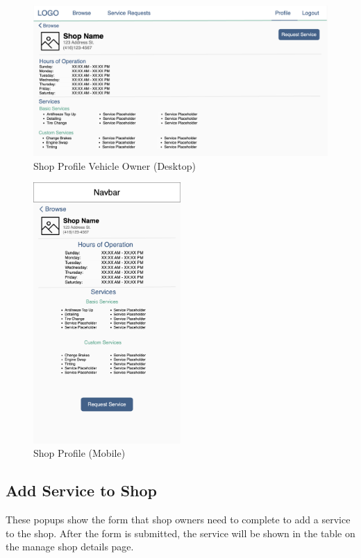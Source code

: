 \documentclass[12pt, titlepage]{article}
\begin{document}
\begin{figure}[H]
	\centering
	\includegraphics[width=\textwidth]{mockups/Shop Profile (Vehicle Owner) (Desktop).png}
	\caption{Shop Profile \textemdash{} Vehicle Owner (Desktop)}
\end{figure}

\begin{figure}[H]
	\centering
	\includegraphics[width=0.5\textwidth]{mockups/Shop Profile (Mobile).png}
	\caption{Shop Profile (Mobile)}
\end{figure}

\subsection{Add Service to Shop}
These popups show the form that shop owners need to complete to add a service to the shop. After
the form is submitted, the service will be shown in the table on the manage shop details page.
\end{document}
